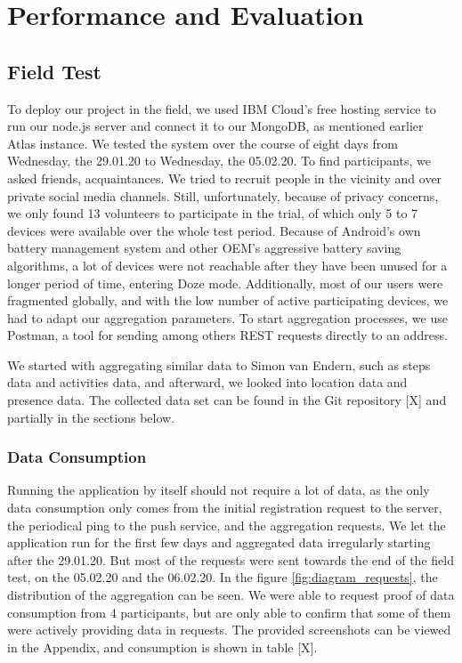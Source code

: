 
\chapter{Performance and Evaluation}\label{chapter:evaluation}
\section{Field Test}
To deploy our project in the field, we used IBM Cloud's free hosting service to run our node.js server and connect it to our MongoDB, as mentioned earlier Atlas instance. We tested the system over the course of eight days from Wednesday, the 29.01.20 to Wednesday, the 05.02.20. To find participants, we asked friends, acquaintances. We tried to recruit people in the vicinity and over private social media channels. Still, unfortunately, because of privacy concerns, we only found 13 volunteers to participate in the trial, of which only 5 to 7 devices were available over the whole test period. Because of Android's own battery management system and other OEM's aggressive battery saving algorithms, a lot of devices were not reachable after they have been unused for a longer period of time, entering Doze mode. Additionally, most of our users were fragmented globally, and with the low number of active participating devices, we had to adapt our aggregation parameters. To start aggregation processes, we use Postman, a tool for sending among others REST requests directly to an address.

We started with aggregating similar data to Simon van Endern, such as steps data and activities data, and afterward, we looked into location data and presence data. The collected data set can be found in the Git repository [X] and partially in the sections below.
\subsection{Data Consumption}
Running the application by itself should not require a lot of data, as the only data consumption only comes from the initial registration request to the server, the periodical ping to the push service, and the aggregation requests. We let the application run for the first few days and aggregated data irregularly starting after the 29.01.20. But most of the requests were sent towards the end of the field test, on the 05.02.20 and the 06.02.20. In the figure \ref{fig:diagram_requests}, the distribution of the aggregation can be seen. We were able to request proof of data consumption from 4 participants, but are only able to confirm that some of them were actively providing data in requests. The provided screenshots can be viewed in the Appendix, and consumption is shown in table [X]. 

